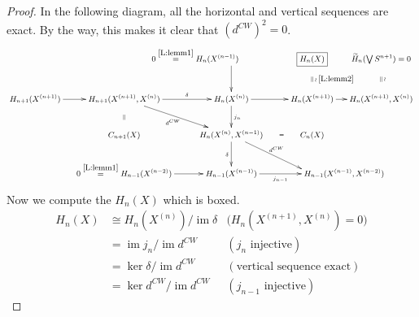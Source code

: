 \documentclass[12pt]{article}
\theoremstyle{plain}
\theoremstyle{definition}
\theoremstyle{remark}
\renewcommand{\H}{\widetilde H}
\DeclareMathOperator{\im}{im}
\begin{document}
 \begin{proof} In the following diagram, all the horizontal and vertical sequences are
 exact. By the way, this makes it clear that $(d^{CW})^2=0$.
   \[\small \xymatrix @C-1pc{
    & &
   **[l] 0\overset{\ref{L:lemm1}}= H_n(X^{(n-1)}) \ar[d] & \fbox{$H_n(X)$}\ar@{}[d]|{\parallel}^{\wr\: \ref{L:lemm2}} & \H_n(\bigvee S^{n+1})=0 \ar@{}[d]|{\parallel}^{\wr} \\
   H_{n+1}(X^{(n+1)}) \ar[r] & H_{n+1}(X^{(n+1)},X^{(n)}) \ar[rd]_<>(.5){d^{CW}} \ar[r]^<>(.5)\delta &
   H_n(X^{(n)}) \ar[d]^{j_n} \ar[r] & H_n(X^{(n+1)}) \ar[r] & H_n(X^{(n+1)},X^{(n)})\\
    & C_{n+1}(X) \ar@{}[u]|{\parallel} & H_n(X^{(n)},X^{(n-1)}) \ar[d]_\delta \ar@{}[r]|<>(.5){=} \ar[rd]^{d^{CW}} & C_n(X) \\
    & 0\overset{\ref{L:lemm1}}{=} H_{n-1}(X^{(n-2)})\ar[r] & H_{n-1}(X^{(n-1)})
   \ar[r]_<>(.5){j_{n-1}} & \rlap{$H_{n-1}(X^{(n-1)},X^{(n-2)})$}\qquad
   }\]
   Now we compute the $H_n(X)$ which is boxed.
   \begin{align*}
     H_n(X) &\cong H_n(X^{(n)})/\im \delta & \bigl(H_n(X^{(n+1)},X^{(n)})=0\bigr)\\
     &= \im j_n /\im d^{CW} & (j_n\text{ injective})\\
     &= \ker \delta/ \im d^{CW} & (\text{vertical sequence exact})\\
     &= \ker d^{CW}/\im d^{CW} & (j_{n-1}\text{ injective})
   \end{align*}
 \end{proof}
\end{document}
